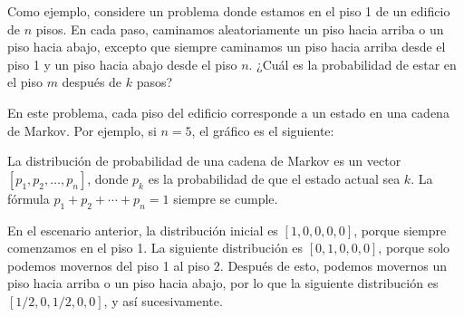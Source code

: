 Como ejemplo, considere un problema
donde estamos en el piso 1 de un edificio de $n$ pisos.
En cada paso, caminamos aleatoriamente un piso
hacia arriba o un piso hacia abajo, excepto que siempre
caminamos un piso hacia arriba desde el piso 1 y un piso hacia abajo
desde el piso $n$.
¿Cuál es la probabilidad de estar en el piso $m$
después de $k$ pasos?

En este problema, cada piso del edificio
corresponde a un estado en una cadena de Markov.
Por ejemplo, si $n=5$, el gráfico es el siguiente:

\begin{center}
\end{center}

La distribución de probabilidad
de una cadena de Markov es un vector
$[p_1,p_2,\ldots,p_n]$, donde $p_k$ es la
probabilidad de que el estado actual sea $k$.
La fórmula $p_1+p_2+\cdots+p_n=1$ siempre se cumple.

En el escenario anterior, la distribución inicial es
$[1,0,0,0,0]$, porque siempre comenzamos en el piso 1.
La siguiente distribución es $[0,1,0,0,0]$,
porque solo podemos movernos del piso 1 al piso 2.
Después de esto, podemos movernos un piso hacia arriba
o un piso hacia abajo, por lo que la siguiente distribución es
$[1/2,0,1/2,0,0]$, y así sucesivamente.

